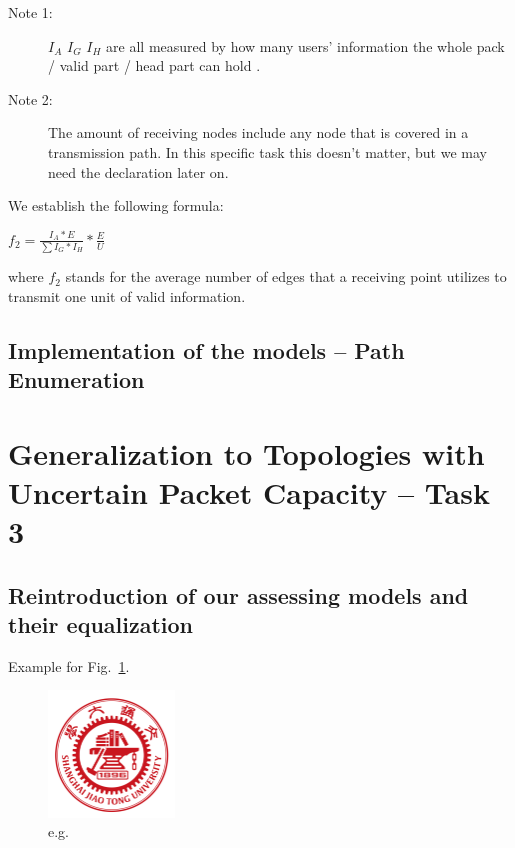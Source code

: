 \documentclass{mcmthesis}
\begin{document}
%	
%	
%	
%	
\begin{description}
	\item[Note 1: ] $I_{A}$ $I_{G}$ $I_{H}$ are all measured by how many users' information the whole pack / valid part / head part can hold .
	\item[Note 2: ] The amount of receiving nodes include any node that is covered in a transmission path. In this specific task this doesn't matter, but we may need the declaration later on.
\end{description}

We establish the following formula:

\quad$f_2 = \frac{I_{A} * E}{\sum I_{G} * I_{H}} * \frac{E}{U}$


where $f_2$ stands for the average number of edges that a receiving point utilizes to transmit one unit of valid information.


\subsection{Implementation of the models -- Path Enumeration}


\section{Generalization to Topologies with Uncertain Packet Capacity -- Task 3}
\subsection{Reintroduction of our assessing models and their equalization}


Example for Fig.~\ref{fig:eg1}.

\begin{figure}[H]
	\centering
	\includegraphics[width = 0.3\textwidth]{figure/figure1.png} 
	\caption{e.g.}
	\label{fig:eg1}
\end{figure}
\end{document}
